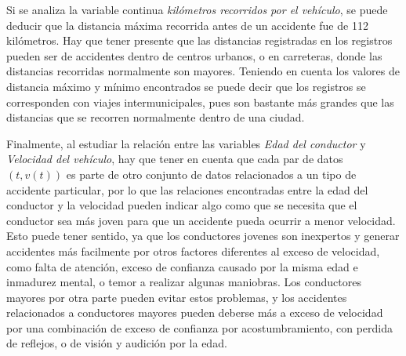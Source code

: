 Si se analiza la variable continua \emph{kilómetros recorridos por el vehículo}, se puede deducir que la distancia máxima recorrida antes de un accidente fue de 112 kilómetros. Hay que tener presente que las distancias registradas en los registros pueden ser de accidentes dentro de centros urbanos, o en carreteras, donde las distancias recorridas normalmente son mayores. Teniendo en cuenta los valores de distancia máximo y mínimo encontrados se puede decir que los registros se corresponden con viajes intermunicipales, pues son bastante más grandes que las distancias que se recorren normalmente dentro de una ciudad.\par
Finalmente, al estudiar la relación entre las variables \emph{Edad del conductor} y \emph{Velocidad del vehículo}, hay que tener en cuenta que cada par de datos $(t, v(t))$ es parte de otro conjunto de datos relacionados a un tipo de accidente particular, por lo que las relaciones encontradas entre la edad del conductor y la velocidad pueden indicar algo como que se necesita que el conductor sea más joven para que un accidente pueda ocurrir a menor velocidad. Esto puede tener sentido, ya que los conductores jovenes son inexpertos y generar accidentes más facilmente por otros factores diferentes al exceso de velocidad, como falta de atención, exceso de confianza causado por la misma edad e inmadurez mental, o temor a realizar algunas maniobras. Los conductores mayores por otra parte pueden evitar estos problemas, y los accidentes relacionados a conductores mayores pueden deberse más a exceso de velocidad por una combinación de exceso de confianza por acostumbramiento, con perdida de reflejos, o de visión y audición por la edad.